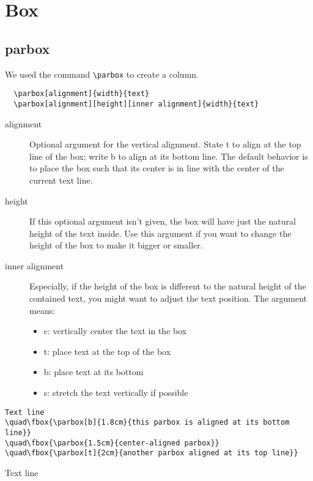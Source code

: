 
\chapter{Box}

\section{parbox}

We used the command \lstinline{\parbox} to create a column.

\begin{lstlisting}
  \parbox[alignment]{width}{text}
  \parbox[alignment][height][inner alignment]{width}{text}
\end{lstlisting}

\begin{description}
\item[alignment] Optional argument for the vertical alignment. State t to align at the top line of the box; write b to align at its bottom line. The default behavior is to place the box such that its center is in line with the center of the current text line.
\item[height] If this optional argument isn't given, the box will have just the natural height of the text inside. Use this argument if you want to change the height of the box to make it bigger or smaller.
\item[inner alignment] Especially, if the height of the box is different to the natural height of the contained text, you might want to adjust the text position. The argument means:
  \begin{itemize}
  \item c: vertically center the text in the box
  \item t: place text at the top of the box
  \item b: place text at its bottom
  \item s: stretch the text vertically if possible
  \end{itemize}
  
\end{description}

\begin{lstlisting}
Text line
\quad\fbox{\parbox[b]{1.8cm}{this parbox is aligned at its bottom line}}
\quad\fbox{\parbox{1.5cm}{center-aligned parbox}}
\quad\fbox{\parbox[t]{2cm}{another parbox aligned at its top line}}
\end{lstlisting}


Text line
\quad{}
\quad{}
\quad{}


